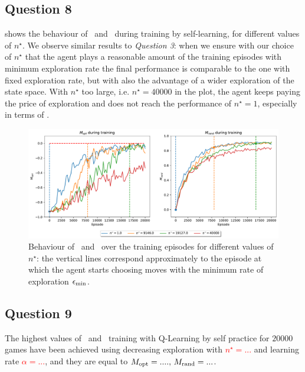 \documentclass[10pt]{IEEEtran}
\begin{document}
\subsection*{Question 8}
 shows the behaviour of \mopt\ and \mrand\ during training by self-learning, for different values of $n^{\star}$. We observe similar results to \emph{Question 3}: when we ensure with our choice of $n^{\star}$ that the agent plays a reasonable amount of the training episodes with minimum exploration rate the final performance is comparable to the one with fixed exploration rate, but with also the advantage of a wider exploration of the state space. With $n^{\star}$ too large, i.e. $n^{\star} = 40000$ in the plot, the agent keeps paying the price of exploration and does not reach the performance of $n^{\star} = 1$, especially in terms of \mopt.

\begin{figure}[h]
    \centering
    \includegraphics[width=\linewidth]{code/figures/performance_n_star_self.pdf}
    \caption{Behaviour of \mopt\ and \mrand\ over the training episodes for different values of $n^{\star}$:  the vertical lines correspond approximately to the episode at which the agent starts choosing moves with the minimum rate of exploration $\epsilon_{\text{min}}$.}
    \label{plot_question8}
\end{figure}



\subsection*{Question 9}
The highest values of \mopt\  and \mrand\  training with Q-Learning by self practice for $20000$ games have been achieved using decreasing exploration with \textcolor{red}{$n^{\star} = ...$} and learning rate \textcolor{red}{$\alpha = ...$}, and they are equal to \textcolor{red}{$M_{\text{opt}} = ...., \, M_{\text{rand}} = ...$}.
\end{document}
